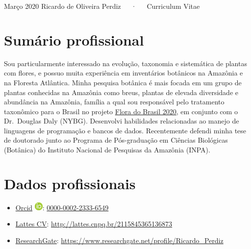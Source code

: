 \documentclass[11pt, a4paper]{awesome-cv}
\providecommand{\tightlist}{%
	\setlength{\itemsep}{0pt}\setlength{\parskip}{0pt}}
\begin{document}
\makecvheader

\makecvfooter
  {Março 2020}
    {Ricardo de Oliveira Perdiz~~~·~~~Curriculum Vitae}
  {\thepage}





\hypertarget{sumuxe1rio-profissional}{%
\section{Sumário profissional}\label{sumuxe1rio-profissional}}

Sou particularmente interessado na evolução, taxonomia e sistemática de plantas com flores, e possuo muita experiência em inventários botânicos na Amazônia e na Floresta Atlântica. Minha pesquisa botânica é mais focada em um grupo de plantas conhecidas na Amazônia como breus, plantas de elevada diversidade e abundância na Amazônia, família a qual sou responsável pelo tratamento taxonômico para o Brasil no projeto \href{http://floradobrasil.jbrj.gov.br/reflora/listaBrasil/PrincipalUC/PrincipalUC.do}{Flora do Brasil 2020}, em conjunto com o Dr.~Douglas Daly (NYBG). Desenvolvi habilidades relacionadas ao manejo de linguagens de programação e bancos de dados. Recentemente defendi minha tese de doutorado junto ao Programa de Pós-graduação em Ciências Biológicas (Botânica) do Instituto Nacional de Pesquisas da Amazônia (INPA).

\hypertarget{dados-profissionais}{%
\section{Dados profissionais}\label{dados-profissionais}}

\begin{itemize}
\tightlist
\item
  \href{https://orcid.org/0000-0002-2333-6549}{Orcid} \includegraphics{orcid_16x16.png}: \href{https://orcid.org/0000-0002-2333-6549}{0000-0002-2333-6549}
\item
  \href{http://lattes.cnpq.br/2115845365136873}{Lattes CV}: \url{http://lattes.cnpq.br/2115845365136873}
\item
  \href{https://www.researchgate.net/profile/Ricardo_Perdiz}{ResearchGate}: \url{https://www.researchgate.net/profile/Ricardo_Perdiz}
\end{itemize}
\end{document}
